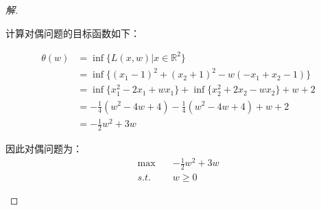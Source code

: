 \documentclass[a4paper]{article}
\begin{document}
\begin{proof}[解]
\begin{enumerate}
    计算对偶问题的目标函数如下：
    
    \begin{equation}
    \begin{aligned}
    \theta(w)&=\inf \{L(x,w)|x\in \mathbb{R}^2\} \\
    &=\inf\{(x_1-1)^2+(x_2+1)^2-w(-x_1+x_2-1)\} \\
    &=\inf\{x_1^2-2x_1+wx_1\}+\inf\{x_2^2+2x_2-wx_2\}+w+2 \\
    &=-\frac{1}{4}(w^2-4w+4)-\frac{1}{4}(w^2-4w+4)+w+2 \\
    &=-\frac{1}{2}w^2+3w
    \end{aligned}
    \end{equation}
    
    因此对偶问题为：
    \begin{equation}
    \begin{aligned}
    \max\quad &-\frac{1}{2}w^2+3w \\
    s.t.\quad &w\ge0
    \end{aligned}
    \end{equation}
\end{enumerate}
\end{proof}
\end{document}
